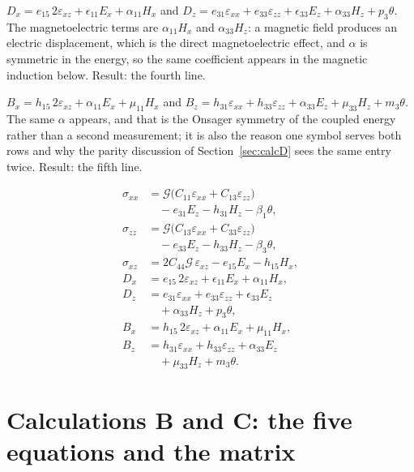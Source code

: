 \documentclass[11pt]{article}
\makeatletter
\newif\ifshowworked
\newenvironment{worked}{%
  \ifshowworked\par\smallskip\noindent\textit{Working.}\par\smallskip\else
  \setbox\z@\vbox\bgroup\fi}{\ifshowworked\par\smallskip\else\egroup\fi}
\newcommand{\Gcal}{\mathcal{G}}
\makeatother
\begin{document}
\begin{worked}
$D_x=e_{15}\,2\varepsilon_{xz}+\epsilon_{11}E_x+\alpha_{11}H_x$ and
$D_z=e_{31}\varepsilon_{xx}+e_{33}\varepsilon_{zz}+\epsilon_{33}E_z+\alpha_{33}H_z+p_3\theta$. The
magnetoelectric terms are $\alpha_{11}H_x$ and $\alpha_{33}H_z$: a magnetic field produces an electric
displacement, which is the direct magnetoelectric effect, and $\alpha$ is symmetric in the energy, so the
same coefficient appears in the magnetic induction below. Result: the fourth line.
\end{worked}

\begin{worked}
$B_x=h_{15}\,2\varepsilon_{xz}+\alpha_{11}E_x+\mu_{11}H_x$ and
$B_z=h_{31}\varepsilon_{xx}+h_{33}\varepsilon_{zz}+\alpha_{33}E_z+\mu_{33}H_z+m_3\theta$. The same
$\alpha$ appears, and that is the Onsager symmetry of the coupled energy rather than a second measurement;
it is also the reason one symbol serves both rows and why the parity discussion of
Section~\ref{sec:calcD} sees the same entry twice. Result: the fifth line.
\end{worked}

\begin{align}
\sigma_{xx}&=\Gcal\bigl(C_{11}\varepsilon_{xx}+C_{13}\varepsilon_{zz}\bigr) \nonumber\\
&\quad -e_{31}E_z-h_{31}H_z-\beta_1\theta, \\
\sigma_{zz}&=\Gcal\bigl(C_{13}\varepsilon_{xx}+C_{33}\varepsilon_{zz}\bigr) \nonumber\\
&\quad -e_{33}E_z-h_{33}H_z-\beta_3\theta, \\
\sigma_{xz}&=2C_{44}\Gcal\,\varepsilon_{xz}-e_{15}E_x-h_{15}H_x, \\
D_x&=e_{15}\,2\varepsilon_{xz}+\epsilon_{11}E_x+\alpha_{11}H_x, \\
D_z&=e_{31}\varepsilon_{xx}+e_{33}\varepsilon_{zz}+\epsilon_{33}E_z \nonumber\\
&\quad +\alpha_{33}H_z+p_3\theta, \\
B_x&=h_{15}\,2\varepsilon_{xz}+\alpha_{11}E_x+\mu_{11}H_x, \\
B_z&=h_{31}\varepsilon_{xx}+h_{33}\varepsilon_{zz}+\alpha_{33}E_z \nonumber\\
&\quad +\mu_{33}H_z+m_3\theta .
\end{align}

\section{Calculations B and C: the five equations and the matrix}\label{sec:calcBC}
\end{document}
